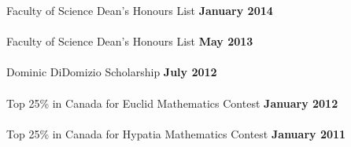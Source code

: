 \documentclass[margin,line]{resume}
\begin{document}
\begin{resume}
    {Faculty of Science Dean's Honours List} \hfill \textbf{ January 2014}\vspace{-3mm}\\\\
    {Faculty of Science Dean's Honours List} \hfill \textbf{ May 2013}\vspace{-3mm}\\\\
    {Dominic DiDomizio Scholarship} \hfill \textbf{ July 2012}\vspace{-3mm}\\\\
    {Top 25\% in Canada for Euclid Mathematics Contest} \hfill \textbf{January 2012}\vspace{-3mm}\\\\
    {Top 25\% in Canada for Hypatia Mathematics Contest} \hfill \textbf{January 2011}\vspace{-3mm}\\
    
\sectionline

\end{resume}
\end{document}
